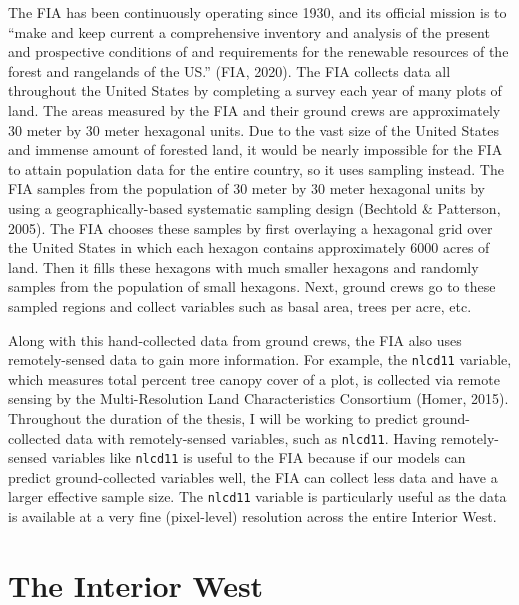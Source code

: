 \documentclass[12pt,twoside]{reedthesis}
\begin{document}
The FIA has been continuously operating since 1930, and its official mission is to ``make and keep current a comprehensive inventory and analysis of the present and prospective conditions of and requirements for the renewable resources of the forest and rangelands of the US.'' (FIA, 2020). The FIA collects data all throughout the United States by completing a survey each year of many plots of land. The areas measured by the FIA and their ground crews are approximately 30 meter by 30 meter hexagonal units. Due to the vast size of the United States and immense amount of forested land, it would be nearly impossible for the FIA to attain population data for the entire country, so it uses sampling instead. The FIA samples from the population of 30 meter by 30 meter hexagonal units by using a geographically-based systematic sampling design (Bechtold \& Patterson, 2005). The FIA chooses these samples by first overlaying a hexagonal grid over the United States in which each hexagon contains approximately 6000 acres of land. Then it fills these hexagons with much smaller hexagons and randomly samples from the population of small hexagons. Next, ground crews go to these sampled regions and collect variables such as basal area, trees per acre, etc.

Along with this hand-collected data from ground crews, the FIA also uses remotely-sensed data to gain more information. For example, the \texttt{nlcd11} variable, which measures total percent tree canopy cover of a plot, is collected via remote sensing by the Multi-Resolution Land Characteristics Consortium (Homer, 2015). Throughout the duration of the thesis, I will be working to predict ground-collected data with remotely-sensed variables, such as \texttt{nlcd11}. Having remotely-sensed variables like \texttt{nlcd11} is useful to the FIA because if our models can predict ground-collected variables well, the FIA can collect less data and have a larger effective sample size. The \texttt{nlcd11} variable is particularly useful as the data is available at a very fine (pixel-level) resolution across the entire Interior West.
\clearpage

\hypertarget{the-interior-west}{%
\section{The Interior West}\label{the-interior-west}}
\end{document}
